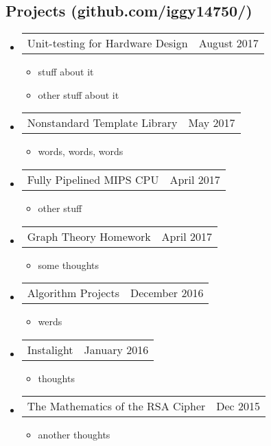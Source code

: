 \documentclass[18pt]{article}
\makeatletter
\providecommand{\tightlist}{
    \setlength{\itemsep}{0pt}\setlength{\parskip}{0pt}
}
\providecommand{\datetable}[2]{
    \begin{tabular*}{\textwidth}{r @{\extracolsep{\fill}} l}
        #1 & #2
    \end{tabular*}
}
\makeatother
\begin{document}
  \subsection*{Projects (github.com/iggy14750/)}\label{projects}
    \begin{itemize}\tightlist
        
      \item \datetable{Unit-testing for Hardware Design}{August 2017}
      \begin{itemize}\tightlist
        \item stuff about it
        \item other stuff about it
      \end{itemize}
        
      \item \datetable{Nonstandard Template Library}{May 2017}
      \begin{itemize}\tightlist
        \item words, words, words
      \end{itemize}
          
      \item \datetable{Fully Pipelined MIPS CPU}{April 2017}
      \begin{itemize}\tightlist
        \item other stuff
      \end{itemize}
      
      \item \datetable{Graph Theory Homework}{April 2017}
      \begin{itemize}\tightlist
        \item some thoughts
      \end{itemize}
      
      \item \datetable{Algorithm Projects}{December 2016}
        \begin{itemize}\tightlist
          \item werds
        \end{itemize}
        
      \item \datetable{Instalight}{January 2016}
      \begin{itemize}\tightlist
        \item thoughts
      \end{itemize}
      
      \item \datetable{The Mathematics of the RSA Cipher}{Dec 2015}
      \begin{itemize}\tightlist
        \item another thoughts
      \end{itemize}
  \end{itemize}
    
\end{document}
